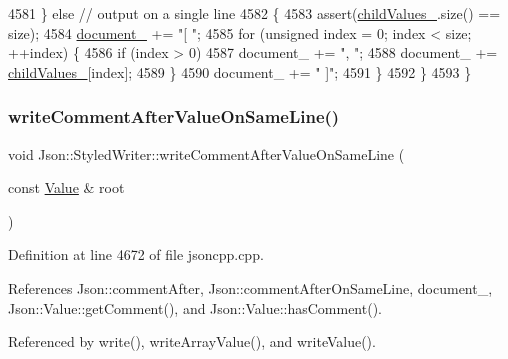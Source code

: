\begin{DoxyCode}
4581     \} \textcolor{keywordflow}{else} \textcolor{comment}{// output on a single line}
4582     \{
4583       assert(\hyperlink{class_json_1_1_styled_writer_a1f905495f0705365af117ec541e29fdf}{childValues\_}.size() == size);
4584       \hyperlink{class_json_1_1_styled_writer_ae967b0c77e4d7cb889ce7b6ee4ce28d7}{document\_} += \textcolor{stringliteral}{"[ "};
4585       \textcolor{keywordflow}{for} (\textcolor{keywordtype}{unsigned} index = 0; index < size; ++index) \{
4586         \textcolor{keywordflow}{if} (index > 0)
4587           document\_ += \textcolor{stringliteral}{", "};
4588         document\_ += \hyperlink{class_json_1_1_styled_writer_a1f905495f0705365af117ec541e29fdf}{childValues\_}[index];
4589       \}
4590       document\_ += \textcolor{stringliteral}{" ]"};
4591     \}
4592   \}
4593 \}
\end{DoxyCode}
\mbox{\label{class_json_1_1_styled_writer_ab12b274c62822fc51ec4617c6be95139}} 
\subsubsection{\texorpdfstring{write\+Comment\+After\+Value\+On\+Same\+Line()}{writeCommentAfterValueOnSameLine()}}
{\footnotesize\ttfamily void Json\+::\+Styled\+Writer\+::write\+Comment\+After\+Value\+On\+Same\+Line (\begin{DoxyParamCaption}\item[{const \hyperlink{class_json_1_1_value}{Value} \&}]{root }\end{DoxyParamCaption})\hspace{0.3cm}{\ttfamily [private]}}



Definition at line 4672 of file jsoncpp.\+cpp.



References Json\+::comment\+After, Json\+::comment\+After\+On\+Same\+Line, document\+\_\+, Json\+::\+Value\+::get\+Comment(), and Json\+::\+Value\+::has\+Comment().



Referenced by write(), write\+Array\+Value(), and write\+Value().


